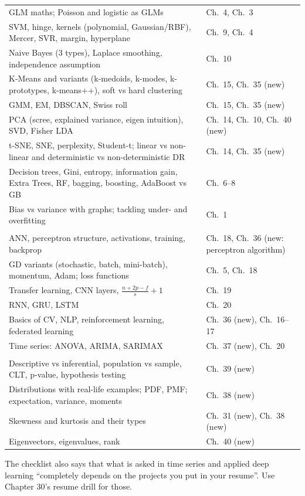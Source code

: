 \begin{center}
\begin{tabularx}{\linewidth}{>{\raggedright\arraybackslash}X >{\raggedright\arraybackslash}p{4.6cm}}
GLM maths; Poisson and logistic as GLMs & Ch.\ 4, Ch.\ 3\\
SVM, hinge, kernels (polynomial, Gaussian/RBF), Mercer, SVR, margin, hyperplane & Ch.\ 9, Ch.\ 4\\
Naive Bayes (3 types), Laplace smoothing, independence assumption & Ch.\ 10\\
K-Means and variants (k-medoids, k-modes, k-prototypes, k-means++), soft vs hard clustering & Ch.\ 15, Ch.\ 35 (new)\\
GMM, EM, DBSCAN, Swiss roll & Ch.\ 15, Ch.\ 35 (new)\\
PCA (scree, explained variance, eigen intuition), SVD, Fisher LDA & Ch.\ 14, Ch.\ 10, Ch.\ 40 (new)\\
t-SNE, SNE, perplexity, Student-t; linear vs non-linear and deterministic vs non-deterministic DR & Ch.\ 14, Ch.\ 35 (new)\\
Decision trees, Gini, entropy, information gain, Extra Trees, RF, bagging, boosting, AdaBoost vs GB & Ch.\ 6--8\\
Bias vs variance with graphs; tackling under- and overfitting & Ch.\ 1\\
\midrule
\multicolumn{2}{l}{\textbf{\color{accent}Deep Learning}}\\
ANN, perceptron structure, activations, training, backprop & Ch.\ 18, Ch.\ 36 (new: perceptron algorithm)\\
GD variants (stochastic, batch, mini-batch), momentum, Adam; loss functions & Ch.\ 5, Ch.\ 18\\
Transfer learning, CNN layers, $\frac{n+2p-f}{s}+1$ & Ch.\ 19\\
RNN, GRU, LSTM & Ch.\ 20\\
Basics of CV, NLP, reinforcement learning, federated learning & Ch.\ 36 (new), Ch.\ 16--17\\
Time series: ANOVA, ARIMA, SARIMAX & Ch.\ 37 (new), Ch.\ 20\\
\midrule
\multicolumn{2}{l}{\textbf{\color{accent}Statistics, Probability, Linear Algebra}}\\
Descriptive vs inferential, population vs sample, CLT, p-value, hypothesis testing & Ch.\ 39 (new)\\
Distributions with real-life examples; PDF, PMF; expectation, variance, moments & Ch.\ 38 (new)\\
Skewness and kurtosis and their types & Ch.\ 31 (new), Ch.\ 38 (new)\\
Eigenvectors, eigenvalues, rank & Ch.\ 40 (new)\\
\bottomrule
\end{tabularx}
\end{center}

The checklist also says that what is asked in time series and applied deep learning ``completely depends on the projects you put in your resume''.
Use Chapter 30's resume drill for those.
